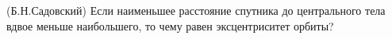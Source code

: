 (Б.Н.Садовский)
Если наименьшее расстояние спутника до центрального тела вдвое
меньше наибольшего, то чему равен эксцентриситет орбиты?
